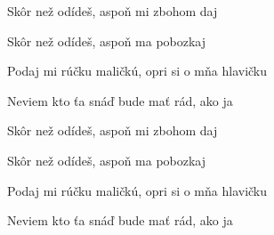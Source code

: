 \begin{song}
\bigskip

Skôr než odídeš,  aspoň mi zbohom daj  \par
Skôr než odídeš, aspoň ma pobozkaj \par
Podaj mi rúčku maličkú, opri si o mňa hlavičku \par
Neviem kto ťa snáď bude mať rád, ako ja \par

\bigskip

  \par
{}   \par

\bigskip

Skôr než odídeš,  aspoň mi zbohom daj  \par
Skôr než odídeš, aspoň ma pobozkaj \par
Podaj mi rúčku maličkú, opri si o mňa hlavičku \par
Neviem kto ťa snáď bude mať rád, ako ja \par

\bigskip

 \par

\end{song}
